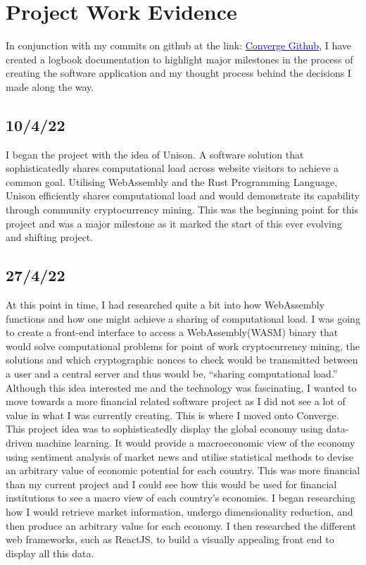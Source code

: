 \let\textcircled=\pgftextcircled
\chapter{Project Work Evidence}
In conjunction with my commits on github at the link: \href{https://github.com/alexjgreig/converge}{\textcolor{blue}{Converge Github}}, I have created a logbook documentation to highlight major milestones in the process of creating the software application and my thought process behind the decisions I made along the way. \\

\section{10/4/22}
I began the project with the idea of Unison. A software solution that sophisticatedly shares computational load across website visitors to achieve a common goal. Utilising WebAssembly and the Rust Programming Language, Unison efficiently shares computational load and would demonstrate its capability through community cryptocurrency mining. This was the beginning point for this project and was a major milestone as it marked the start of this ever evolving and shifting project. \\
\section{27/4/22}
At this point in time, I had researched quite a bit into how WebAssembly functions and how one might achieve a sharing of computational load. I was going to create a front-end interface to access a WebAssembly(WASM) binary that would solve computational problems for point of work cryptocurrency mining, the solutions and which cryptographic nonces to check would be transmitted between a user and a central server and thus would be, “sharing computational load.” Although this idea interested me and the technology was fascinating, I wanted to move towards a more financial related software project as I did not see a lot of value in what I was currently creating. This is where I moved onto Converge. This project idea was to sophisticatedly display the global economy using data-driven machine learning. It would provide a macroeconomic view of the economy using sentiment analysis of market news and utilise statistical methods to devise an arbitrary value of economic potential for each country. This was more financial than my current project and I could see how this would be used for financial institutions to see a macro view of each country’s economies. I began researching how I would retrieve market information, undergo dimensionality reduction, and then produce an arbitrary value for each economy. I then researched the different web frameworks, such as ReactJS, to build a visually appealing front end to display all this data. \\

